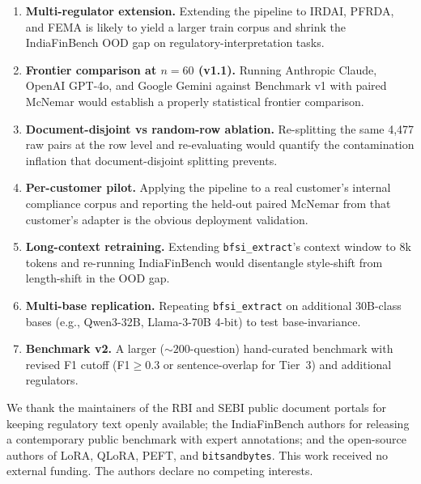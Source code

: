 \documentclass{article}
\begin{document}
\begin{enumerate}
  \item \textbf{Multi-regulator extension.} Extending the pipeline to IRDAI, PFRDA, and FEMA is likely to yield a larger train corpus and shrink the IndiaFinBench OOD gap on regulatory-interpretation tasks.
  \item \textbf{Frontier comparison at $n{=}60$ (v1.1).} Running Anthropic Claude, OpenAI GPT-4o, and Google Gemini against Benchmark v1 with paired McNemar would establish a properly statistical frontier comparison.
  \item \textbf{Document-disjoint vs random-row ablation.} Re-splitting the same 4{,}477 raw pairs at the row level and re-evaluating would quantify the contamination inflation that document-disjoint splitting prevents.
  \item \textbf{Per-customer pilot.} Applying the pipeline to a real customer's internal compliance corpus and reporting the held-out paired McNemar from that customer's adapter is the obvious deployment validation.
  \item \textbf{Long-context retraining.} Extending \texttt{bfsi\_extract}'s context window to 8k tokens and re-running IndiaFinBench would disentangle style-shift from length-shift in the OOD gap.
  \item \textbf{Multi-base replication.} Repeating \texttt{bfsi\_extract} on additional 30B-class bases (e.g., Qwen3-32B, Llama-3-70B 4-bit) to test base-invariance.
  \item \textbf{Benchmark v2.} A larger ($\sim200$-question) hand-curated benchmark with revised F1 cutoff (F1$\geq0.3$ or sentence-overlap for Tier~3) and additional regulators.
\end{enumerate}

\begin{ack}
We thank the maintainers of the RBI and SEBI public document portals for keeping regulatory text openly available; the IndiaFinBench authors for releasing a contemporary public benchmark with expert annotations; and the open-source authors of LoRA, QLoRA, PEFT, and \texttt{bitsandbytes}. This work received no external funding. The authors declare no competing interests.
\end{ack}
\end{document}
